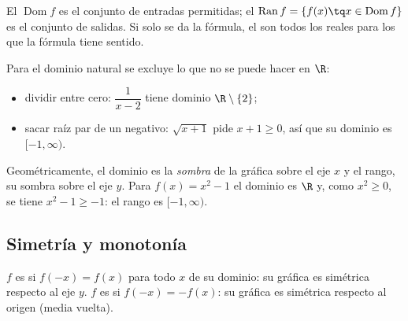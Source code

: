 \documentclass[11pt,a4paper]{article}
\begin{document}
\begin{definicion}
El  $\operatorname{Dom} f$ es el conjunto de entradas permitidas; el 
$\operatorname{Ran} f=\{f(x)\tq x\in\operatorname{Dom} f\}$ es el conjunto de salidas. Si solo se da la fórmula, el
 son todos los reales para los que la fórmula tiene sentido.
\end{definicion}

\begin{minipage}[c]{0.55\linewidth}
Para el dominio natural se excluye lo que no se puede hacer en $\R$:
\begin{itemize}
\item dividir entre cero: $\dfrac{1}{x-2}$ tiene dominio $\R\setminus\{2\}$;
\item sacar raíz par de un negativo: $\sqrt{x+1}$ pide $x+1\ge 0$, así que su dominio es $[-1,\infty)$.
\end{itemize}
\smallskip
Geométricamente, el dominio es la \emph{sombra} de la gráfica sobre el eje $x$ y el rango, su sombra sobre el eje $y$.
Para $f(x)=x^2-1$ el dominio es $\R$ y, como $x^2\ge 0$, se tiene $x^2-1\ge-1$: el rango es $[-1,\infty)$.
\end{minipage}\hfill
\begin{minipage}[c]{0.4\linewidth}\centering
{}
\end{minipage}

\subsection{Simetría y monotonía}
\begin{definicion}
$f$ es  si $f(-x)=f(x)$ para todo $x$ de su dominio: su gráfica es simétrica respecto al eje $y$.
$f$ es  si $f(-x)=-f(x)$: su gráfica es simétrica respecto al origen (media vuelta).
\end{definicion}
\end{document}
